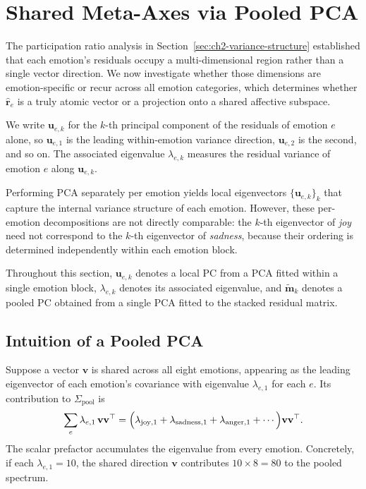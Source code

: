 \section{Shared Meta-Axes via Pooled PCA}
\label{sec:ch2-meta-axes}

The participation ratio analysis in Section~\ref{sec:ch2-variance-structure} established that each emotion's residuals occupy a multi-dimensional region rather than a single vector direction. We now investigate whether those dimensions are emotion-specific or recur across all emotion categories, which determines whether $\hat{\mathbf{r}}_e$ is a truly atomic vector or a projection onto a shared affective subspace.\par

We write $\mathbf{u}_{e,k}$ for the $k$-th principal component of the residuals of emotion $e$ alone, so $\mathbf{u}_{e,1}$ is the leading within-emotion variance direction, $\mathbf{u}_{e,2}$ is the second, and so on. The associated eigenvalue $\lambda_{e,k}$ measures the residual variance of emotion $e$ along $\mathbf{u}_{e,k}$.\par

Performing PCA separately per emotion yields local eigenvectors $\{\mathbf{u}_{e,k}\}_{k}$ that capture the internal variance structure of each emotion. However, these per-emotion decompositions are not directly comparable: the $k$-th eigenvector of \textit{joy} need not correspond to the $k$-th eigenvector of \textit{sadness}, because their ordering is determined independently within each emotion block.\par

Throughout this section, $\mathbf{u}_{e,k}$ denotes a local PC from a PCA fitted within a single emotion block, $\lambda_{e,k}$ denotes its associated eigenvalue, and $\tilde{\mathbf{m}}_k$ denotes a pooled PC obtained from a single PCA fitted to the stacked residual matrix.\par

\subsection{Intuition of a Pooled PCA}

Suppose a vector $\mathbf{v}$ is shared across all eight emotions, appearing as the leading eigenvector of each emotion's covariance with eigenvalue $\lambda_{e,1}$ for each $e$. Its contribution to $\Sigma_{\mathrm{pool}}$ is
\[
\sum_{e} \lambda_{e,1}\,\mathbf{v}\mathbf{v}^\top
= \Bigl(\lambda_{\mathrm{joy},1} + \lambda_{\mathrm{sadness},1} + \lambda_{\mathrm{anger},1} + \cdots\Bigr)\mathbf{v}\mathbf{v}^\top.
\]
The scalar prefactor accumulates the eigenvalue from every emotion. Concretely, if each $\lambda_{e,1} = 10$, the shared direction $\mathbf{v}$ contributes $10 \times 8 = 80$ to the pooled spectrum.\par

